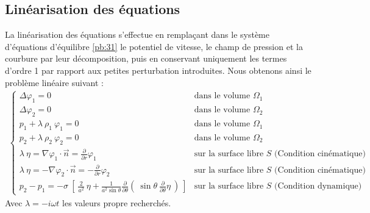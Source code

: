 \documentclass[a4paper]{report}
\begin{document}
\subsection{Linéarisation des équations}
La linéarisation des équations s'effectue en remplaçant dans le système d'équations d'équilibre \eqref{pb:31} le potentiel de vitesse, le champ de pression et la courbure par leur décomposition, puis en conservant uniquement les termes d'ordre 1 par rapport aux petites perturbation introduites. Nous obtenons ainsi le problème linéaire suivant :
\begin{eqnarray}\label{pb:32}         %
\left\{                              %
\begin{array}{lll}                   %
\Delta \varphi_1 = 0                                                                                     & \text{dans le volume $\Omega_1$}    \\%
\Delta \varphi_2 = 0                                                                                     & \text{dans le volume $\Omega_2$}    \\%
p_1 + \lambda\ \rho_1\ \varphi_1 = 0                                                        & \text{dans le volume $\Omega_1$}    \\%
p_2 + \lambda\ \rho_2\ \varphi_2 = 0                                                        & \text{dans le volume $\Omega_2$}    \\%
\lambda\ \eta = \nabla \varphi_1 \cdot \vec{n} = \frac{\partial}{\partial r} \varphi_1      & \text{sur la surface libre $S$ (Condition cinématique)}      \\
\lambda\ \eta = - \nabla \varphi_2 \cdot \vec{n} = - \frac{\partial}{\partial r} \varphi_2      & \text{sur la surface libre $S$ (Condition cinématique)}      \\
p_2 -p_1 = - \sigma\ \left[\ \frac{2}{a^2} \ \eta
                      + \frac{1}{a^2 \sin\theta} \frac{\partial}{\partial \theta}(\ \sin\theta \ \frac{\partial}{\partial \theta} \eta \ )\ \right]
& \text{sur la surface libre $S$ (Condition dynamique)}   %
\end{array}                          %
\right.                              %
\end{eqnarray}                       %
Avec $\lambda = - i \omega t$ les valeurs propre recherchés.
\end{document}
